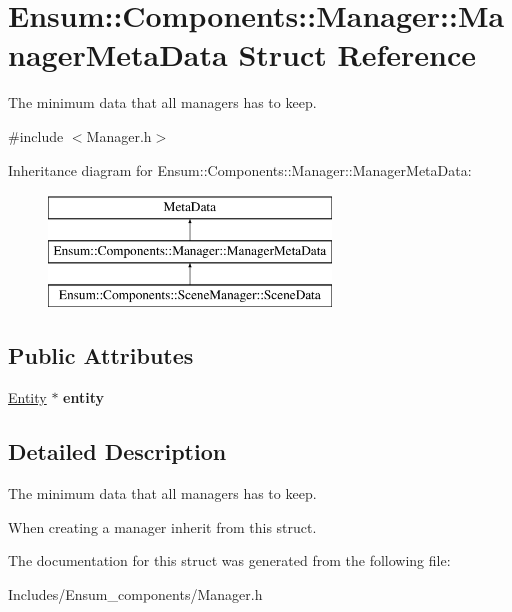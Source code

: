 \hypertarget{struct_ensum_1_1_components_1_1_manager_1_1_manager_meta_data}{}\section{Ensum\+:\+:Components\+:\+:Manager\+:\+:Manager\+Meta\+Data Struct Reference}
\label{struct_ensum_1_1_components_1_1_manager_1_1_manager_meta_data}


The minimum data that all managers has to keep.  




{\ttfamily \#include $<$Manager.\+h$>$}

Inheritance diagram for Ensum\+:\+:Components\+:\+:Manager\+:\+:Manager\+Meta\+Data\+:\begin{figure}[H]
\begin{center}
\leavevmode
\includegraphics[height=3.000000cm]{struct_ensum_1_1_components_1_1_manager_1_1_manager_meta_data}
\end{center}
\end{figure}
\subsection*{Public Attributes}
\begin{DoxyCompactItemize}
\item 
\hyperlink{struct_ensum_1_1_components_1_1_entity}{Entity} $\ast$ {\bfseries entity}\hypertarget{struct_ensum_1_1_components_1_1_manager_1_1_manager_meta_data_ac7f0ba43f4aa9d1586e2ebc0f6b52276}{}\label{struct_ensum_1_1_components_1_1_manager_1_1_manager_meta_data_ac7f0ba43f4aa9d1586e2ebc0f6b52276}

\end{DoxyCompactItemize}


\subsection{Detailed Description}
The minimum data that all managers has to keep. 

When creating a manager inherit from this struct. 

The documentation for this struct was generated from the following file\+:\begin{DoxyCompactItemize}
\item 
Includes/\+Ensum\+\_\+components/Manager.\+h\end{DoxyCompactItemize}
